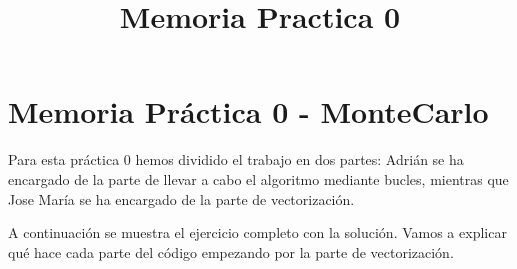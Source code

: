 \documentclass[11pt]{article}
\title{Memoria Practica 0}
\begin{document}
    
    
    \maketitle
    
    

    
    \section{Memoria Práctica 0 -
MonteCarlo}\label{memoria-pruxe1ctica-0---montecarlo}

    Para esta práctica 0 hemos dividido el trabajo en dos partes: Adrián se
ha encargado de la parte de llevar a cabo el algoritmo mediante bucles,
mientras que Jose María se ha encargado de la parte de vectorización.

A continuación se muestra el ejercicio completo con la solución. Vamos a
explicar qué hace cada parte del código empezando por la parte de
vectorización.
\end{document}
